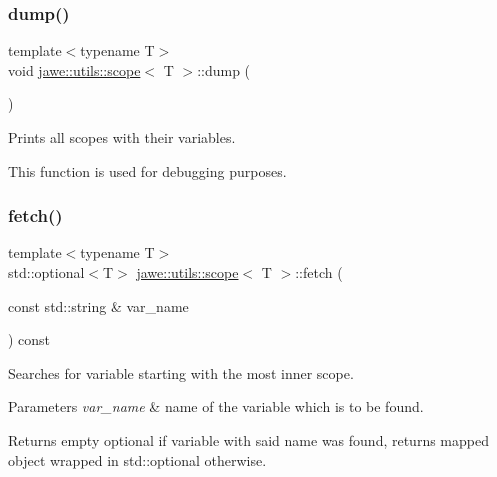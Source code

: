 \subsubsection{\texorpdfstring{dump()}{dump()}}
{\footnotesize\ttfamily template$<$typename T$>$ \\
void \hyperlink{classjawe_1_1utils_1_1scope}{jawe\+::utils\+::scope}$<$ T $>$\+::dump (\begin{DoxyParamCaption}{ }\end{DoxyParamCaption})\hspace{0.3cm}{\ttfamily [inline]}}

Prints all scopes with their variables.

This function is used for debugging purposes. \mbox{\label{classjawe_1_1utils_1_1scope_aa0db4d0cbe6a4020ed496cd5cbcd8e6a}} 
\subsubsection{\texorpdfstring{fetch()}{fetch()}}
{\footnotesize\ttfamily template$<$typename T$>$ \\
std\+::optional$<$T$>$ \hyperlink{classjawe_1_1utils_1_1scope}{jawe\+::utils\+::scope}$<$ T $>$\+::fetch (\begin{DoxyParamCaption}\item[{const std\+::string \&}]{var\+\_\+name }\end{DoxyParamCaption}) const\hspace{0.3cm}{\ttfamily [inline]}}

Searches for variable starting with the most inner scope.


\begin{DoxyParams}{Parameters}
{\em var\+\_\+name} & name of the variable which is to be found. \\
\hline
\end{DoxyParams}
\begin{DoxyReturn}{Returns}
empty optional if variable with said name was found, returns mapped object wrapped in std\+::optional otherwise. 
\end{DoxyReturn}
\mbox{\label{classjawe_1_1utils_1_1scope_a0c78dd9721664a665190297c4a5b06a7}} 
